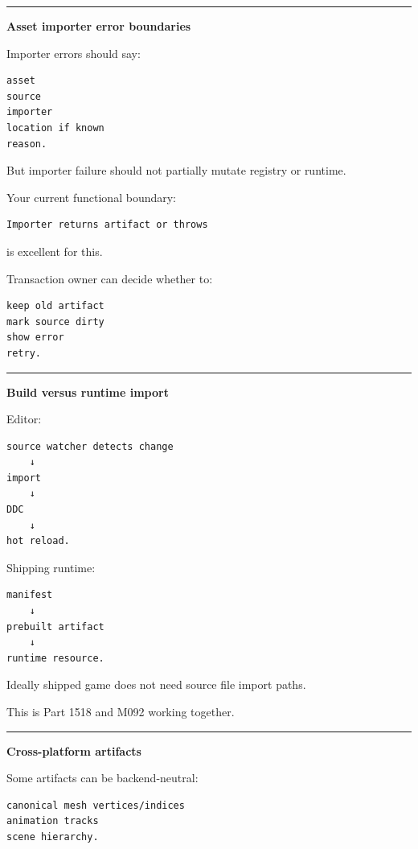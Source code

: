 \begin{center}\rule{0.5\linewidth}{0.5pt}\end{center}

\textbf{Asset importer error boundaries}

Importer errors should say:

\begin{verbatim}
asset
source
importer
location if known
reason.
\end{verbatim}

But importer failure should not partially mutate registry or runtime.

Your current functional boundary:

\begin{verbatim}
Importer returns artifact or throws
\end{verbatim}

is excellent for this.

Transaction owner can decide whether to:

\begin{verbatim}
keep old artifact
mark source dirty
show error
retry.
\end{verbatim}

\begin{center}\rule{0.5\linewidth}{0.5pt}\end{center}

\textbf{Build versus runtime import}

Editor:

\begin{verbatim}
source watcher detects change
    ↓
import
    ↓
DDC
    ↓
hot reload.
\end{verbatim}

Shipping runtime:

\begin{verbatim}
manifest
    ↓
prebuilt artifact
    ↓
runtime resource.
\end{verbatim}

Ideally shipped game does not need source file import paths.

This is Part 1518 and M092 working together.

\begin{center}\rule{0.5\linewidth}{0.5pt}\end{center}

\textbf{Cross-platform artifacts}

Some artifacts can be backend-neutral:

\begin{verbatim}
canonical mesh vertices/indices
animation tracks
scene hierarchy.
\end{verbatim}

